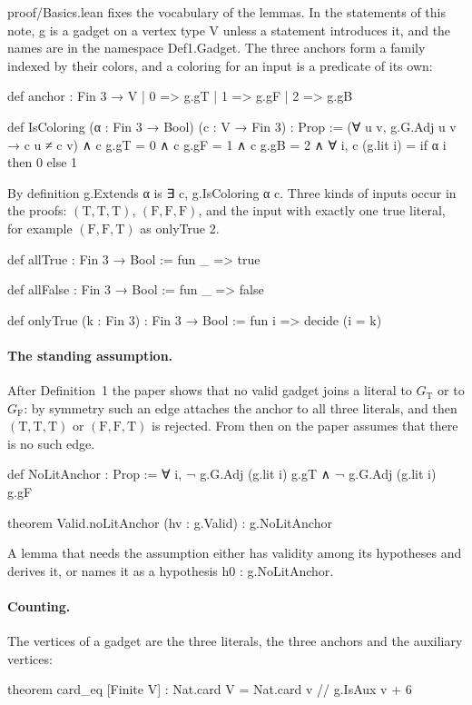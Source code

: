\documentclass[11pt,a4paper]{article}
\newcommand{\leanus}{\textunderscore\allowbreak}
\newcommand{\lean}[1]{{\ttfamily\let\_\leanus #1}}
\newcommand{\GT}{G_{\mathrm{T}}}
\newcommand{\GF}{G_{\mathrm{F}}}
\newcommand{\T}{\mathrm{T}}
\newcommand{\F}{\mathrm{F}}
\begin{document}
\lean{proof/Basics.lean} fixes the vocabulary of the lemmas. In the
statements of this note, \lean{g} is a gadget on a vertex type \lean{V}
unless a statement introduces it, and the names are in the namespace
\lean{Def1.Gadget}. The three anchors form a family indexed by their
colors, and a coloring for an input is a predicate of its own:
\begin{code}
def anchor : Fin 3 → V
  | 0 => g.gT
  | 1 => g.gF
  | 2 => g.gB

def IsColoring (α : Fin 3 → Bool) (c : V → Fin 3) : Prop :=
  (∀ u v, g.G.Adj u v → c u ≠ c v) ∧ c g.gT = 0 ∧ c g.gF = 1 ∧ c g.gB = 2 ∧
    ∀ i, c (g.lit i) = if α i then 0 else 1
\end{code}
By definition \lean{g.Extends α} is \lean{∃ c, g.IsColoring α c}. Three kinds
of inputs occur in the proofs: $(\T,\T,\T)$, $(\F,\F,\F)$, and the input
with exactly one true literal, for example $(\F,\F,\T)$ as
\lean{onlyTrue 2}.
\begin{code}
def allTrue : Fin 3 → Bool := fun _ => true

def allFalse : Fin 3 → Bool := fun _ => false

def onlyTrue (k : Fin 3) : Fin 3 → Bool := fun i => decide (i = k)
\end{code}

\paragraph{The standing assumption.} After Definition~1 the paper shows that
no valid gadget joins a literal to $\GT$ or to $\GF$: by symmetry such an
edge attaches the anchor to all three literals, and then $(\T,\T,\T)$ or
$(\F,\F,\T)$ is rejected. From then on the paper assumes that there is no
such edge.
\begin{code}
def NoLitAnchor : Prop := ∀ i, ¬ g.G.Adj (g.lit i) g.gT ∧ ¬ g.G.Adj (g.lit i) g.gF

theorem Valid.noLitAnchor (hv : g.Valid) : g.NoLitAnchor
\end{code}
A lemma that needs the assumption either has validity among its hypotheses
and derives it, or names it as a hypothesis \lean{h0 : g.NoLitAnchor}.

\paragraph{Counting.} The vertices of a gadget are the three literals, the
three anchors and the auxiliary vertices:
\begin{code}
theorem card_eq [Finite V] : Nat.card V = Nat.card {v // g.IsAux v} + 6
\end{code}
\end{document}
